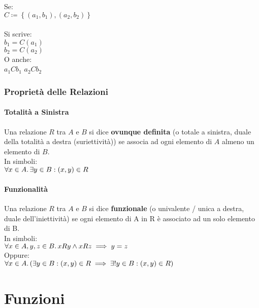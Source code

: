 \documentclass[a4paper, twoside, italian, 11pt]{book}
\newcommand{\braces}[1] {\left \{ #1 \right \}}
\begin{document}
\noindent
Se: \\
$C \coloneqq \braces{(a_1, b_1), (a_2, b_2)}$ \\\\
Si scrive:\\
$b_1 = C(a_1)$ \\
$b_2 = C(a_2)$ \\

\noindent
O anche: \\
$a_1Cb_1$
$a_2Cb_2$


\subsection{Proprietà delle Relazioni}


\subsubsection{Totalità a Sinistra}

Una relazione $R$ tra $A$ e $B$ si dice \textbf{ovunque definita} (o totale a sinistra, duale della totalità a destra (suriettività)) se associa ad ogni elemento di $A$ almeno un elemento di $B$. \\

\noindent
In simboli: \\

$\forall x \in A \ldotp \exists y \in B : (x, y) \in R$


\subsubsection{Funzionalità}

Una relazione $R$ tra $A$ e $B$ si dice \textbf{funzionale} (o univalente / unica a destra, duale dell'iniettività) se ogni elemento di A in R è associato ad un solo elemento di B. \\

\noindent
In simboli: \\

$\forall x \in A, y, z \in B \ldotp xRy \land xRz \implies y = z$ \\

\noindent
Oppure:\\

$\forall x \in A \ldotp (\exists y \in B : (x, y) \in R \implies \exists! y \in B : (x, y) \in R)$



\chapter{Funzioni}
\end{document}
